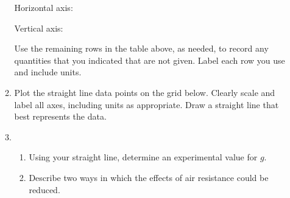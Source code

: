\documentclass{../../../oss-apphys}
\begin{document}
\begin{enumerate}[leftmargin=15pt]
\begin{enumerate}[leftmargin=15pt,resume]
    \vspace{.1in}Horizontal axis: \underline{\hspace{1in}}

    \vspace{.1in}Vertical axis: \underline{\hspace{1in}}

    \vspace{.1in}Use the remaining rows in the table above, as needed, to
    record any quantities that you indicated that are not given. Label each row
    you use and include units.

  \item Plot the straight line data points on the grid below. Clearly scale and
    label all axes, including units as appropriate. Draw a straight line that
    best represents the data.
    \begin{center}
    \end{center}
  \item
    \begin{enumerate}[leftmargin=15pt]
    \item Using your straight line, determine an experimental value for $g$.
    \item Describe two ways in which the effects of air resistance could be
      reduced.
    \end{enumerate}
  \end{enumerate}
  \newpage
%
%
%    
%  

\end{enumerate}
\end{document}
